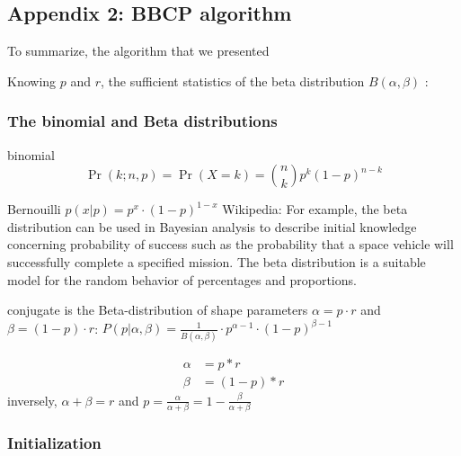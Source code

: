 \documentclass[12pt,english]{article}%
\newcommand{\eq}[1]{\begin{equation*}#1\end{equation*}}
\newcommand{\eqs}[1]{\begin{align*}#1\end{align*}}
\begin{document}
\subsection{Appendix 2: BBCP algorithm}
\label{app:bcp}


To summarize, the algorithm that we presented
%
%
%
%

Knowing $p$ and $r$, the sufficient statistics of the beta distribution $B(\alpha, \beta)$ :


\subsubsection{The binomial and Beta distributions}

binomial
\eq{
\Pr(k;n,p) = \Pr(X = k) = {n\choose k}p^k(1-p)^{n-k}
}


Bernouilli $p(x | p) = p^x \cdot (1-p)^{1-x}$
Wikipedia: For example, the beta distribution can be used in Bayesian analysis to describe initial knowledge concerning probability of success such as the probability that a space vehicle will successfully complete a specified mission. The beta distribution is a suitable model for the random behavior of percentages and proportions.

conjugate is the Beta-distribution of shape parameters $\alpha = p\cdot r$ and $\beta = (1- p)\cdot r$:
$ P(p | \alpha, \beta ) = \frac{1}{B(\alpha, \beta)} \cdot p^{\alpha -1} \cdot (1-p)^{\beta - 1} $

\eqs{
        \alpha &= p*r \\
        \beta  &= (1-p)*r
    }
inversely, $\alpha + \beta = r$ and $p = \frac{\alpha}{\alpha +\beta} = 1- \frac{\beta}{\alpha + \beta}$



\subsubsection{Initialization}
\end{document}
